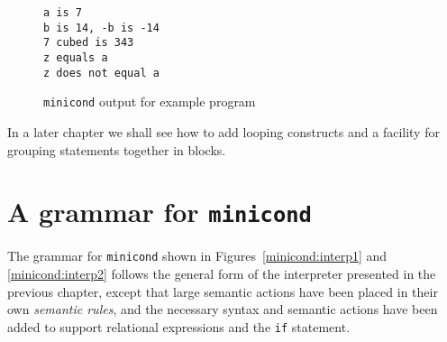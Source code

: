 \begin{figure}
\hspace*{2cm}
\begin{minipage}{30cm}
\footnotesize
\begin{verbatim}
a is 7
b is 14, -b is -14
7 cubed is 343
z equals a
z does not equal a
\end{verbatim}
\end{minipage}
\caption{{\tt minicond} output for example program}
\label{minicond:output}
\end{figure}

In a later chapter we shall see how to add looping constructs and a facility for grouping
statements together in blocks.

\section{A grammar for {\tt minicond}}

The grammar for {\tt minicond} shown in Figures~\ref{minicond:interp1}
and \ref{minicond:interp2} follows the general form of the interpreter
presented in the previous chapter, except that large semantic actions
have been placed in their own {\em semantic rules}, and the necessary
syntax and semantic actions have been added to support relational
expressions and the {\tt if} statement.

